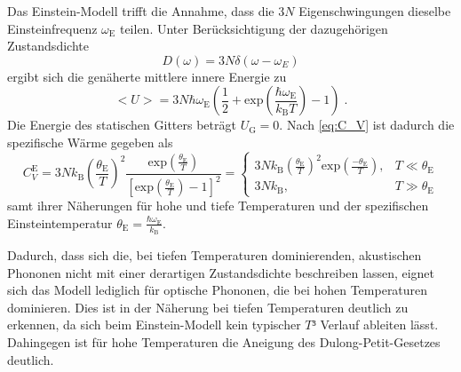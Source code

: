 Das Einstein-Modell trifft die Annahme, dass die $3N$ Eigenschwingungen dieselbe Einsteinfrequenz $\omega_\text{E}$ teilen.
Unter Berücksichtigung der dazugehörigen Zustandsdichte
\begin{equation}
    D(\omega) = 3N\delta (\omega-\omega_E)
\end{equation}
ergibt sich die genäherte 
mittlere innere Energie zu
\begin{equation}
    \bigl<U\bigr> = 3N \hbar\omega_\text{E} \left(\frac{1}{2} + \text{exp}\left(\frac{\hbar \omega_\text{E}}{k_\text{B}T}\right)
     - 1\right) \; .
\end{equation}
Die Energie des statischen Gitters beträgt $U_\text{G} = 0$. Nach \autoref{eq:C_V} ist dadurch die spezifische Wärme gegeben als
\begin{equation}
    C_V^\text{E} = 3Nk_\text{B} \left(\frac{\theta_\text{E}}{T}\right)^2 \frac{\text{exp}\left(\frac{\theta_\text{E}}{T}\right)}
    {\left[\text{exp}\left(\frac{\theta_\text{E}}{T}\right) - 1\right]^2} = 
    \begin{cases}
        3Nk_\text{B} \left(\frac{\theta_\text{E}}{T}\right)^2 \text{exp}\left(\frac{-\theta_\text{E}}{T}\right), 
        & T \ll \theta_\text{E} \\
        3Nk_\text{B} , & T \gg \theta_\text{E}
    \end{cases}
\end{equation}
samt ihrer Näherungen für hohe und tiefe Temperaturen und der
spezifischen Einsteintemperatur $\theta_\text{E} = \frac{\hbar\omega_\text{E}}{k_\text{B}}$.

Dadurch, dass sich die, bei tiefen Temperaturen dominierenden, akustischen Phononen nicht mit einer derartigen Zustandsdichte beschreiben lassen,
eignet sich das Modell lediglich für optische Phononen, die bei hohen Temperaturen dominieren.
Dies ist in der Näherung bei tiefen Temperaturen deutlich zu erkennen, da sich beim Einstein-Modell kein typischer $T³$ Verlauf ableiten lässt.
Dahingegen ist für hohe Temperaturen die Aneigung des Dulong-Petit-Gesetzes deutlich.

